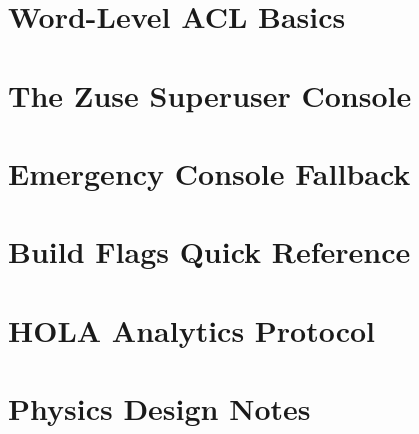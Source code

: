 \chapter{Word-Level ACL Basics}


\chapter{The Zuse Superuser Console}

\chapter{Emergency Console Fallback}

\appendix

\chapter{Build Flags Quick Reference}


\chapter{HOLA Analytics Protocol}


\chapter{Physics Design Notes}


\backmatter




